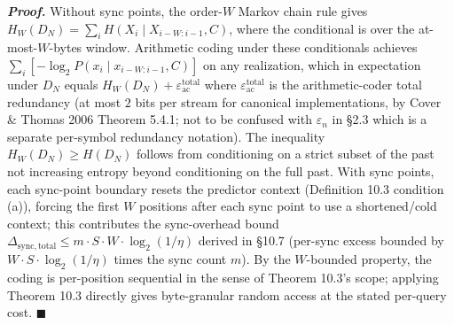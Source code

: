 \documentclass[
]{article}
\begin{document}
\emph{\textbf{Proof.}} Without sync points, the order-$W$ Markov
chain rule gives
$H_W(D_N) = \sum_i H(X_i \mid X_{i-W:i-1}, C)$, where the
conditional is over the at-most-$W$-bytes window. Arithmetic
coding under these conditionals achieves
$\sum_i [-\log_2 P(x_i \mid x_{i-W:i-1}, C)]$ on any realization,
which in expectation under $D_N$ equals
$H_W(D_N) + \varepsilon_{\mathrm{ac}}^{\mathrm{total}}$ where
$\varepsilon_{\mathrm{ac}}^{\mathrm{total}}$ is the
arithmetic-coder total redundancy
(at most $2$ bits per stream for canonical implementations, by
Cover \& Thomas 2006 Theorem 5.4.1; not to be confused with $\varepsilon_n$ in
§2.3 which is a separate per-symbol redundancy notation). The inequality $H_W(D_N) \geq H(D_N)$ follows from
conditioning on a strict subset of the past not increasing entropy
beyond conditioning on the full past. With sync points, each
sync-point boundary resets the predictor context (Definition 10.3
condition (a)), forcing the first $W$ positions after each sync
point to use a shortened/cold context; this contributes the
sync-overhead bound $\Delta_{\mathrm{sync, total}} \leq m \cdot S
\cdot W \cdot \log_2(1/\eta)$ derived in §10.7 (per-sync excess
bounded by $W \cdot S \cdot \log_2(1/\eta)$ times the sync count
$m$). By the $W$-bounded property, the coding is per-position
sequential in the sense of Theorem 10.3's scope; applying Theorem
10.3 directly gives byte-granular random access at the stated
per-query cost. \hfill$\blacksquare$
\end{document}
